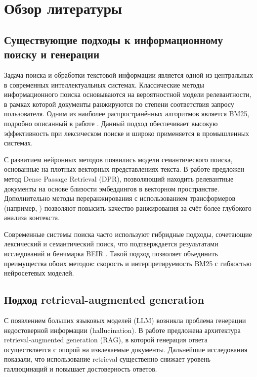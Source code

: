 \documentclass{article}
\begin{document}
\section{Обзор литературы}

\subsection{Существующие подходы к информационному поиску и генерации}

Задача поиска и обработки текстовой информации является одной из центральных в современных интеллектуальных системах. Классические методы информационного поиска основываются на вероятностной модели релевантности, в рамках которой документы ранжируются по степени соответствия запросу пользователя. Одним из наиболее распространённых алгоритмов является BM25, подробно описанный в работе \cite{robertson2009probabilistic}. Данный подход обеспечивает высокую эффективность при лексическом поиске и широко применяется в промышленных системах.

С развитием нейронных методов появились модели семантического поиска, основанные на плотных векторных представлениях текста. В работе \cite{karpukhin2020dense} предложен метод Dense Passage Retrieval (DPR), позволяющий находить релевантные документы на основе близости эмбеддингов в векторном пространстве. Дополнительно методы переранжирования с использованием трансформеров (например, \cite{nogueira2019passage}) позволяют повысить качество ранжирования за счёт более глубокого анализа контекста.

Современные системы поиска часто используют гибридные подходы, сочетающие лексический и семантический поиск, что подтверждается результатами исследований \cite{lin2021notes} и бенчмарка BEIR \cite{thakur2021beir}. Такой подход позволяет объединить преимущества обоих методов: скорость и интерпретируемость BM25 с гибкостью нейросетевых моделей.

\subsection{Подход retrieval-augmented generation}

С появлением больших языковых моделей (LLM) возникла проблема генерации недостоверной информации (hallucination). В работе \cite{lewis2020retrieval} предложена архитектура retrieval-augmented generation (RAG), в которой генерация ответа осуществляется с опорой на извлекаемые документы. Дальнейшие исследования \cite{izacard2021leveraging, shuster2021retrieval} показали, что использование retrieval существенно снижает уровень галлюцинаций и повышает достоверность ответов.
\end{document}
